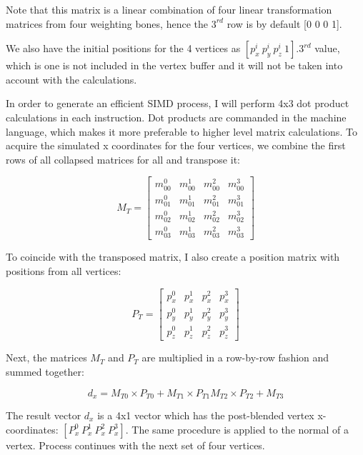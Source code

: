 Note that this matrix is a linear combination of four linear
transformation matrices from four weighting bones, hence the $3^{rd}$ row is by
default  [0 0 0 1].

We also have the initial positions for the 4 vertices as $[p^i_x \: p^i_y  \:
p^i_z  \: 1]$.$3^{rd}$ value, which is one is not included in the vertex buffer
and it will not be taken into account with the calculations.

In order to generate an efficient SIMD process, I will perform 4x3 dot product
calculations in each instruction. Dot products are commanded in the machine language, which makes it more preferable to higher level matrix calculations. To acquire the simulated x coordinates for the four vertices, we combine the first rows of all collapsed matrices for all and transpose it:

\begin{equation}
M_T=
\begin{bmatrix}
m_{00}^0 & m_{00}^1 & m_{00}^2 & m_{00}^3 \\
m_{01}^0 & m_{01}^1 & m_{01}^2 & m_{01}^3 \\
m_{02}^0 & m_{02}^1 & m_{02}^2 & m_{02}^3 \\
m_{03}^0 & m_{03}^1 & m_{03}^2 & m_{03}^3 
\end{bmatrix}
\label{eqn:transposed_weight_matrix}
\end{equation}

To coincide with the transposed matrix, I also create a position matrix with positions from all vertices:

\begin{equation}
P_T=
\begin{bmatrix}
p_{x}^0 & p_{x}^1 & p_{x}^2 & p_{x}^3 \\
p_{y}^0 & p_{y}^1 & p_{y}^2 & p_{y}^3 \\
p_{z}^0 & p_{z}^1 & p_{z}^2 & p_{z}^3  
\end{bmatrix}
\label{eqn:transposed_weight_matrix}
\end{equation}

Next, the matrices $M_T$ and $P_T$ are multiplied in a row-by-row fashion and
summed together:

\begin{equation}
d_x=M_{T0} \times P_{T0} + M_{T1} \times P_{T1} M_{T2} \times P_{T2} +M_{T3}
\label{eqn:transposed_weight_matrix}
\end{equation}

The result vector $d_x$ is a 4x1 vector which has the post-blended vertex
x-coordinates: $[P^0_x \: P^1_x  \: P^2_x  \: P^3_x]$. The same procedure is
applied to the normal of a vertex. Process continues with the next set of four vertices.

